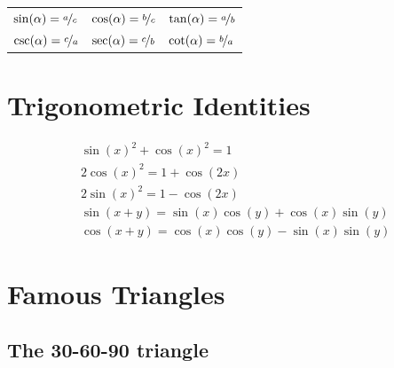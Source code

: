 \documentclass[letterpaper,9pt,fleqn]{extarticle}
\begin{document}
\begin{multicols*}{3}
   \medskip
   
   \begin{tabular}{lll}
   $\sin(\alpha) = \nicefrac{a}{c}$ & $\cos(\alpha) = \nicefrac{b}{c}$ & $\tan(\alpha) = \nicefrac{a}{b}$\\[1ex]
   $\csc(\alpha) = \nicefrac{c}{a}$ & $\sec(\alpha) = \nicefrac{c}{b}$ & $\cot(\alpha) = \nicefrac{b}{a}$  \\
   \end{tabular}

\section*{Trigonometric Identities}
\vspace{-0.05in}
\begin{minipage}[c]{2.0in}

\vspace{-0.335in}
\begin{align*}
&\sin(x)^2 + \cos(x)^2 =1 \\
&2 \cos(x)^2 =  1 + \cos(2 x)\\
&2 \sin(x)^2 = 1 - \cos(2 x)\\
 &\sin\left(x +  y\right) =\sin (x) \cos (y) + \cos (x) \sin (y) \\
&\cos\left(x+y\right)=\cos (x) \cos (y) - \sin (x) \sin (y)    
\end{align*}
\end{minipage}




\section*{Famous Triangles}

\subsection*{The 30-60-90 triangle}

\end{multicols*}
\end{document}
